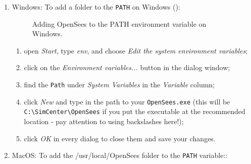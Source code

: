 \begin{enumerate}
\item Windows: To add a folder to the \texttt{PATH} on Windows ():

\begin{figure}[!htbp]
  \caption{Adding OpenSees to the PATH environment variable on Windows.}
  \label{fig:add_env_path}
\end{figure}


\begin{enumerate}
    \item open \emph{Start}, type \emph{env}, and choose \emph{Edit the system environment variables};
    \item click on the \emph{Environment variables...} button in the dialog window;
    \item find the \texttt{Path} under \emph{System Variables} in the \emph{Variable} column;
    \item click \emph{New} and type in the path to your \texttt{OpenSees.exe} (this will be \texttt{C:\textbackslash SimCenter\textbackslash OpenSees} if you put the executable at the recommended location - pay attention to using backslashes here!);
    \item click \emph{OK} in every dialog to close them and save your changes.
\end{enumerate}

\item MacOS: To add the /usr/local/OpenSees folder to the \texttt{PATH} variable::



\end{enumerate}
